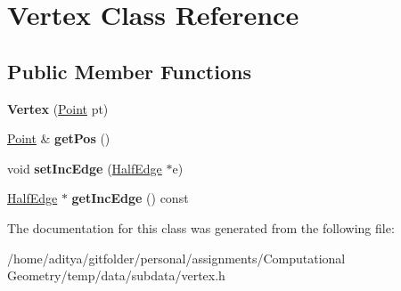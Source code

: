 \hypertarget{class_vertex}{}\section{Vertex Class Reference}
\label{class_vertex}
\subsection*{Public Member Functions}
\begin{DoxyCompactItemize}
\item 
\hypertarget{class_vertex_aa4f548a0ac5fe813e01020fc7e0803ec}{}{\bfseries Vertex} (\hyperlink{class_point}{Point} pt)\label{class_vertex_aa4f548a0ac5fe813e01020fc7e0803ec}

\item 
\hypertarget{class_vertex_ad1f138d467e9eb8a16abaf609542a95d}{}\hyperlink{class_point}{Point} \& {\bfseries get\+Pos} ()\label{class_vertex_ad1f138d467e9eb8a16abaf609542a95d}

\item 
\hypertarget{class_vertex_a81358fe520daab7b85a8bcfd86924fe5}{}void {\bfseries set\+Inc\+Edge} (\hyperlink{class_half_edge}{Half\+Edge} $\ast$e)\label{class_vertex_a81358fe520daab7b85a8bcfd86924fe5}

\item 
\hypertarget{class_vertex_a913169fb2d1fa12356a901fe0dc23fc5}{}\hyperlink{class_half_edge}{Half\+Edge} $\ast$ {\bfseries get\+Inc\+Edge} () const \label{class_vertex_a913169fb2d1fa12356a901fe0dc23fc5}

\end{DoxyCompactItemize}


The documentation for this class was generated from the following file\+:\begin{DoxyCompactItemize}
\item 
/home/aditya/gitfolder/personal/assignments/\+Computational Geometry/temp/data/subdata/vertex.\+h\end{DoxyCompactItemize}
